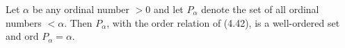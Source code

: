 Let $\alpha$ be any ordinal number $> 0$ and let $P_\alpha$ denote the set of all ordinal numbers $< \alpha$. Then $P_\alpha$, with the order relation of (4.42), is a well-ordered set and ord $P_\alpha = \alpha$.